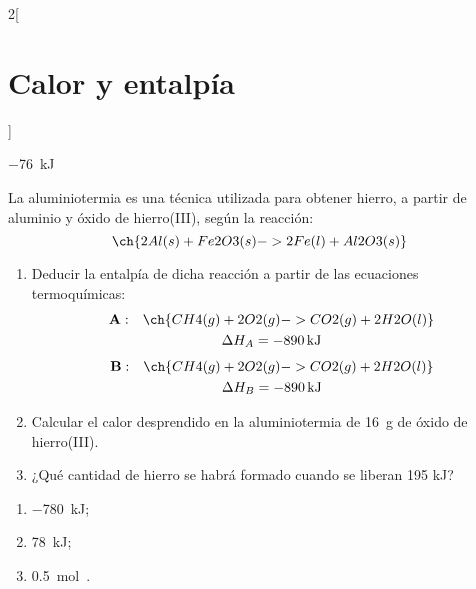 \documentclass[10pt]{article}
\begin{document}
\begin{multicols}{2}[
    \section{Calor y entalpía}
  ]
  \begin{solution}
    \SI{-76}{\kilo\joule}
  \end{solution}




  \begin{exercise}[
      tags    = {termodinámica, entalpía, ley de Hess},
      topics  = {química, termoquímica, termodinámica},
      source  = {},
    ]
    La aluminiotermia es una técnica utilizada para obtener hierro, a partir de aluminio y óxido de hierro(III), según la reacción:
    \[ \ch{2 Al(s) + Fe2O3(s) -> 2 Fe(l) + Al2O3(s)} \]
    \begin{enumerate}
      \item Deducir la entalpía de dicha reacción a partir de las ecuaciones termoquímicas:
        \begin{multline*}
          \mathbf{A:} \quad \ch{CH4(g) + 2 O2(g) -> CO2(g) + 2 H2O(l)} \\
          \Delta H_A = \SI{-890}{\kilo\joule}
        \end{multline*}
        \begin{multline*}
          \mathbf{B:} \quad \ch{CH4(g) + 2 O2(g) -> CO2(g) + 2 H2O(l)} \\
          \Delta H_B = \SI{-890}{\kilo\joule}
        \end{multline*}
      \item Calcular el calor desprendido en la aluminiotermia de \SI{16}{\gram} de óxido de hierro(III).
      \item ¿Qué cantidad de hierro se habrá formado cuando se liberan 195 kJ?
    \end{enumerate}
  \end{exercise}

  \begin{solution}
    \begin{enumerate}
      \item \SI{-780}{\kilo\joule};
      \item \SI{78}{\kilo\joule};
      \item \SI{0.5}{\mole{}}.
    \end{enumerate}
  \end{solution}

\end{multicols}
\end{document}
